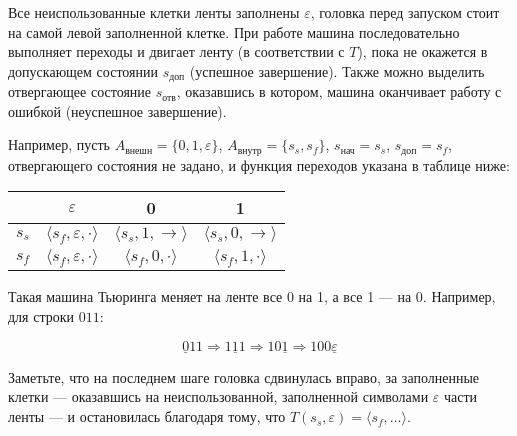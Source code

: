 \documentclass[10pt,a4paper,oneside]{article}
\begin{document}
\begin{enumerate}
Все неиспользованные клетки ленты заполнены $\varepsilon$, головка перед запуском стоит на самой левой заполненной клетке.
При работе машина последовательно выполняет переходы и двигает ленту (в соответствии с $T$), пока не окажется в 
допускающем состоянии $s_\text{доп}$ (успешное завершение). Также можно выделить отвергающее состояние $s_\text{отв}$, 
оказавшись в котором, машина оканчивает работу с ошибкой (неуспешное завершение).

Например, пусть $A_\text{внешн} = \{ 0, 1, \varepsilon \}$, $A_\text{внутр} = \{s_s, s_f\}$, $s_\text{нач} = s_s$, $s_\text{доп} = s_f$,
отвергающего состояния не задано, и функция переходов указана в таблице ниже:

\begin{center}\begin{tabular}{c|ccc}
    & $\varepsilon$ & 0 & 1\\\hline
$s_s$ & $\langle s_f,\varepsilon,\cdot\rangle$ & $\langle s_s,1,\rightarrow\rangle$ & $\langle s_s,0,\rightarrow\rangle$\\
$s_f$ & $\langle s_f,\varepsilon,\cdot\rangle$ & $\langle s_f,0,\cdot\rangle$ & $\langle s_f,1,\cdot\rangle$
\end{tabular}\end{center}

Такая машина Тьюринга меняет на ленте все 0 на 1, а все 1 --- на 0. Например, для строки $011$:

$$\underline{0}11 \Rightarrow 1\underline{1}1 \Rightarrow 10\underline{1} \Rightarrow 100\underline{\varepsilon}$$

Заметьте, что на последнем шаге головка сдвинулась вправо, за заполненные клетки --- оказавшись на неиспользованной, заполненной символами $\varepsilon$
части ленты --- и остановилась благодаря 
тому, что $T(s_s, \varepsilon) = \langle s_f, \dots \rangle$.


\end{enumerate}
\end{document}
